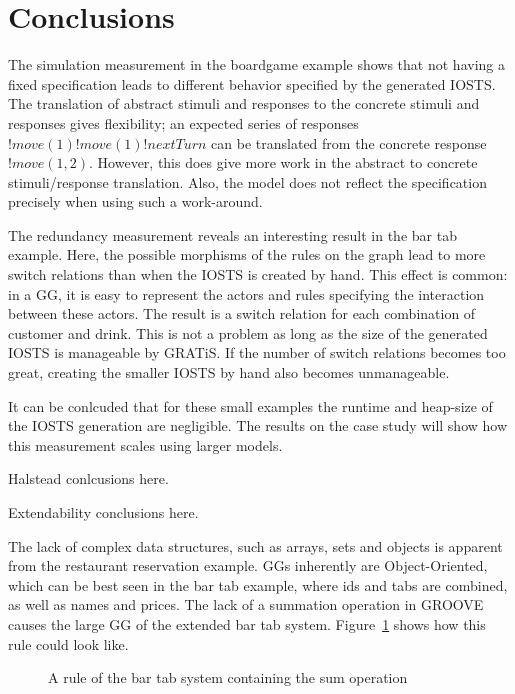 \section{Conclusions}
The simulation measurement in the boardgame example shows that not having a fixed specification leads to different behavior specified by the generated IOSTS. The translation of abstract stimuli and responses to the concrete stimuli and responses gives flexibility; an expected series of responses $!move(1) !move(1) !nextTurn$ can be translated from the concrete response $!move(1,2)$. However, this does give more work in the abstract to concrete stimuli/response translation. Also, the model does not reflect the specification precisely when using such a work-around.

The redundancy measurement reveals an interesting result in the bar tab example. Here, the possible morphisms of the rules on the graph lead to more switch relations than when the IOSTS is created by hand. This effect is common: in a GG, it is easy to represent the actors and rules specifying the interaction between these actors. The result is a switch relation for each combination of customer and drink. This is not a problem as long as the size of the generated IOSTS is manageable by GRATiS. If the number of switch relations becomes too great, creating the smaller IOSTS by hand also becomes unmanageable.


It can be conlcuded that for these small examples the runtime and heap-size of the IOSTS generation are negligible. The results on the case study will show how this measurement scales using larger models.

Halstead conlcusions here.

Extendability conclusions here.

The lack of complex data structures, such as arrays, sets and objects is apparent from the restaurant reservation example. GGs inherently are Object-Oriented, which can be best seen in the bar tab example, where ids and tabs are combined, as well as names and prices. The lack of a summation operation in GROOVE causes the large GG of the extended bar tab system. Figure~\ref{fig:gg-tab-better} shows how this rule could look like. 

\begin{figure}[ht]
  \begin{center}
    
  \end{center}
  \caption{A rule of the bar tab system containing the sum operation}
  \label{fig:gg-tab-better}
\end{figure}


